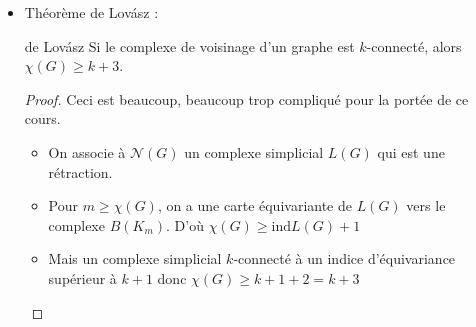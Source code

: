 \documentclass{cours}
\begin{document}
\begin{itemize}
\begin{proof}
    \end{proof}
    \item Théorème de Lovász : 
    \begin{théorème}{de Lovász}{}
        Si le complexe de voisinage d'un graphe est $k$-connecté, alors $\chi(G) \geq k + 3$.
    \end{théorème}
    \begin{proof}
        Ceci est beaucoup, beaucoup trop compliqué pour la portée de ce cours. 
        \begin{itemize}
            \item On associe à $\mathcal{N}(G)$ un complexe simplicial $L(G)$ qui est une rétraction. 
            \item Pour $m \geq \chi(G)$, on a une carte équivariante de $L(G)$ vers le complexe $B(K_{m})$. D'où $\chi(G) \geq \text{ind}L(G) + 1$
            \item Mais un complexe simplicial $k$-connecté à un indice d'équivariance supérieur à $k + 1$ donc $\chi(G) \geq k + 1 + 2 = k + 3$
        \end{itemize}
    \end{proof}
\end{itemize}
\end{document}
